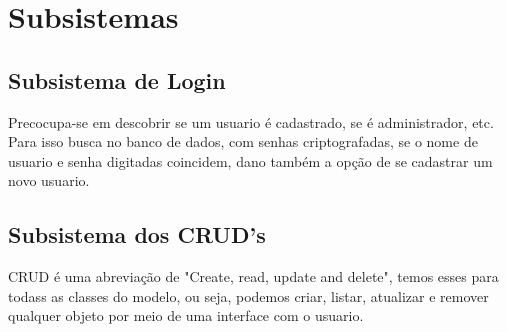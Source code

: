\documentclass[11pt, a4paper]{article}
\begin{document}
	\section{Subsistemas}
	
            \subsection{Subsistema  de Login}
                Precocupa-se em descobrir se um usuario é cadastrado, se é administrador, etc. Para isso busca no banco de dados, com senhas criptografadas, se o nome de usuario e senha digitadas coincidem, dano também a opção de se cadastrar um novo usuario.
            
            \subsection{Subsistema dos CRUD's}
                CRUD é uma abreviação de "Create, read, update and delete", temos esses para todass as classes do modelo, ou seja, podemos criar, listar, atualizar e remover qualquer objeto por meio de uma interface com o usuario.
            
		
		
		
\end{document}

